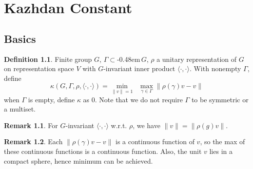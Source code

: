 \documentclass{book}
\newcommand{\syin}{$\subset$\kern-0.48em\raisebox{.20ex}{\tiny S}$\,$}
\newcommand{\inner}[1]{\langle #1 \rangle}
\newcommand{\norm}[1]{\lVert #1 \rVert}
\theoremstyle{definition}
\newtheorem{definition}[lemma]{Definition}
\theoremstyle{remarkstyle}
\newtheorem*{remark}{Remark}%
\begin{document}
\setcounter{chapter}{7}
\chapter{Kazhdan Constant}



\section{Basics}
\begin{definition}
    Finite group $G$, $\Gamma$\syin$G$, $\rho$ a unitary representation of $G$ on representation space $V$ with $G$-invariant inner product $\inner{\cdot,\cdot}$. With nonempty $\Gamma$, define 
    $$
    \kappa (G,\Gamma,\rho,\inner{\cdot,\cdot}) = \min_{\norm{v}=1}\;\;\max_{\gamma\in\Gamma}\norm{\rho(\gamma)v-v}
    $$
    when $\Gamma$ is empty, define $\kappa$ as 0. Note that we do not require $\Gamma$ to be symmetric or a multiset.
\end{definition}
\begin{remark}
    For $G$-invariant $\inner{\cdot,\cdot}$ w.r.t. $\rho$, we have $\norm{v}=\norm{\rho (g)v}$.
\end{remark}
\begin{remark}
    Each $\norm{\rho(\gamma)v-v}$ is a continuous function of $v$, so the max of these continuous functions is a continuous function. Also, the unit $v$ lies in a compact sphere, hence minimum can be achieved. \newline
\end{remark}
\end{document}
